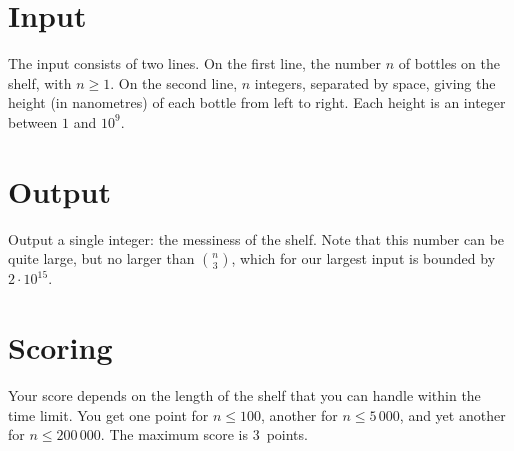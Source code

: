 \section*{Input}

The input consists of two lines.
On the first line, the number $n$ of bottles on the shelf, with $n\geq 1$.
On the second line, $n$ integers, separated by space, giving the height (in nanometres) of each bottle from left to right.
Each height is an integer between $1$ and $10^9$.

\section*{Output}

Output a single integer: the messiness of the shelf.
Note that this number can be quite large, but no larger than $\binom{n}{3}$, which for our largest input is bounded by $2 \cdot 10^{15}$.

\section*{Scoring}

Your score depends on the length of the shelf that you can handle within the time limit.
You get one point for $n\leq 100$, another for $n\leq 5\,000$, and yet another for $n\leq 200\,000$. 
The maximum score is $3$~points.

